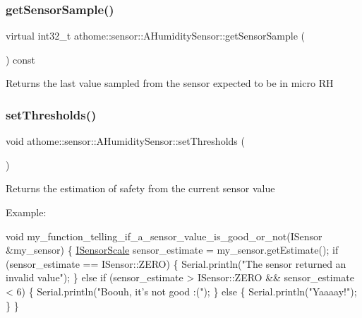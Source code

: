 \subsubsection{\texorpdfstring{get\+Sensor\+Sample()}{getSensorSample()}}
{\footnotesize\ttfamily virtual int32\+\_\+t athome\+::sensor\+::\+A\+Humidity\+Sensor\+::get\+Sensor\+Sample (\begin{DoxyParamCaption}{ }\end{DoxyParamCaption}) const\hspace{0.3cm}{\ttfamily [pure virtual]}}

Returns the last value sampled from the sensor expected to be in micro RH \mbox{\label{classathome_1_1sensor_1_1_a_humidity_sensor_a1a19bfee3db6b0940f1329b42d7ed0d0}} 
\subsubsection{\texorpdfstring{set\+Thresholds()}{setThresholds()}}
{\footnotesize\ttfamily void athome\+::sensor\+::\+A\+Humidity\+Sensor\+::set\+Thresholds (\begin{DoxyParamCaption}\item[{const \mbox{\hyperlink{structathome_1_1sensor_1_1_i_sensor_1_1_i_sensor_thresholds}{I\+Sensor\+Thresholds}} \&}]{ }\end{DoxyParamCaption})\hspace{0.3cm}{\ttfamily [virtual]}}

Returns the estimation of safety from the current sensor value

Example\+:


\begin{DoxyCode}
\textcolor{keywordtype}{void} my\_function\_telling\_if\_a\_sensor\_value\_is\_good\_or\_not(ISensor &my\_sensor) \{
  \mbox{\hyperlink{classathome_1_1sensor_1_1_i_sensor_aa70bc27a4c17c86caf96cca776541ddf}{ISensorScale}} sensor\_estimate = my\_sensor.getEstimate();
  \textcolor{keywordflow}{if} (sensor\_estimate == ISensor::ZERO) \{
    Serial.println(\textcolor{stringliteral}{"The sensor returned an invalid value"});
  \}
  \textcolor{keywordflow}{else} \textcolor{keywordflow}{if} (sensor\_estimate > ISensor::ZERO && sensor\_estimate < 6) \{
    Serial.println(\textcolor{stringliteral}{"Boouh, it's not good :("});
  \}
  \textcolor{keywordflow}{else} \{
    Serial.println(\textcolor{stringliteral}{"Yaaaay!"});
  \}
\}
\end{DoxyCode}
 


